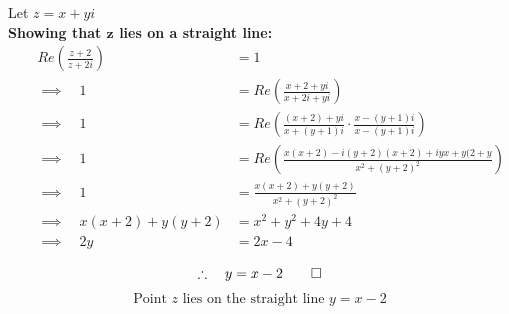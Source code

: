 \documentclass[12pt, a4paper]{report}
\theoremstyle{definition}
\begin{document}
	Let $z = x+yi$\\
	\textbf{Showing that $\boldsymbol{z}$ lies on a straight line: }
	\begin{align*}
		&   & Re(\frac{z+2}{z+2i})           & = 1                                                                       \\
		&   & \implies \quad 1               & = Re(\frac{x+2+yi}{x+2i+yi})                                              \\
		&   & \implies \quad 1               & = Re\left(\frac{(x+2)+yi}{x+(y+1)i}\cdot \frac{x-(y+1)i}{x-(y+1)i}\right) \\
		&   & \implies \quad 1               & = Re\left(\frac{x(x+2) -i(y+2)(x+2) + iyx + y(2+y}{x^2 + (y+2)^2}\right)  \\
		&   & \implies \quad 1               & = \frac{x(x+2) + y(y+2)}{x^2 + (y+2)^2}                                   \\
		&   & \implies \quad x(x+2) + y(y+2) & = x^2  + y^2+4y+4                                                         \\
		&   & \implies \quad 2y              & = 2x-4                                                                    \\
	\end{align*}
	$$\therefore \quad y = x-2 \qed$$
	$$\text{Point } z \text{ lies on the straight line } y = x-2$$
\end{document}
